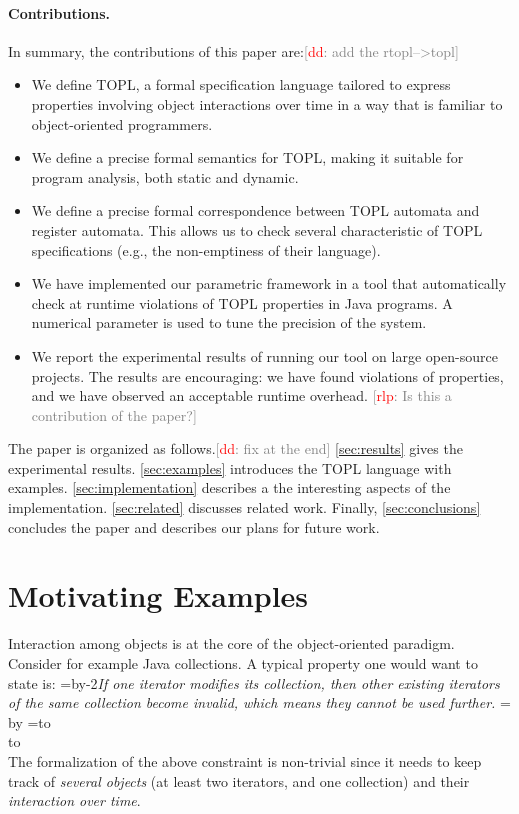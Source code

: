 \documentclass[9pt, preprint]{sigplanconf} %
\newcommand{\noterg}[2]{\textcolor{gray}{[\textcolor{red}{#1}: #2]}}
\newcommand{\rlp}[1]{\noterg{rlp}{#1}}
\newcommand{\dd}[1]{\noterg{dd}{#1}}
\newcommand{\dinocomment}[1]{\dd{#1}}
\newcommand{\quoteindent}{1.5\parindent} %
\newcommand{\eqquote}[2]{{%
  \refstepcounter{equation}\label{#2}%
  \newdimen\qi\qi=\quoteindent
  \setbox0=\vbox{\advance\hsize by-2\qi\noindent\em#1}%
  \newdimen\x\x=\ht0 \advance\x by\dp0%
  \setbox1=\vbox to\x{\vss\hbox{(\arabic{equation})}\vss}%
  \leavevmode\\[1ex]%
  \hbox to\hsize{\hskip\qi\box0\hfil\box1}%
  \\[1ex]}}
\theoremstyle{definition}
\theoremstyle{remark}
\begin{document}
\paragraph{Contributions.}
In summary, the contributions of this paper are:\dd{add the rtopl-->topl}
\begin{itemize}
\item We define TOPL, a formal specification language tailored to express properties involving object interactions over time in a way that is familiar to object-oriented programmers.
\item We define a precise formal semantics for TOPL, making it suitable for program analysis, both static and dynamic.
\item We define a precise formal correspondence between TOPL automata and register automata. This allows us to check several characteristic of TOPL specifications (e.g., the non-emptiness of their language).
\item We have implemented our parametric framework  in a tool that automatically check at runtime violations of TOPL properties in Java programs. A numerical parameter is used to tune the precision of the system.

\item We report the experimental results of running our tool on large open-source projects. The results are encouraging: we have found
violations of properties, and we have observed an acceptable runtime
overhead. \rlp{Is this a contribution of the paper?}
\end{itemize}


The paper is organized as follows.\dinocomment{fix at the end}
\autoref{sec:results} gives the experimental results.
\autoref{sec:examples} introduces the TOPL language with examples.
\autoref{sec:implementation} describes a the interesting aspects of the implementation.
\autoref{sec:related} discusses related work.
Finally, \autoref{sec:conclusions} concludes the paper and describes our plans for future work.

\section{Motivating Examples} %
\label{sec:motivating-examples}
Interaction among objects is at the core of the object-oriented paradigm.
Consider for example  Java collections. A typical property one would want to state  is:
\eqquote{If one iterator modifies its collection, then other existing iterators of the same collection become invalid, which means they cannot be used further.}{q:concur-it}
The formalization of the above constraint is non-trivial since it needs to keep track of {\em several objects} (at least two iterators, and one collection) and their {\em interaction over time}.
\end{document}
